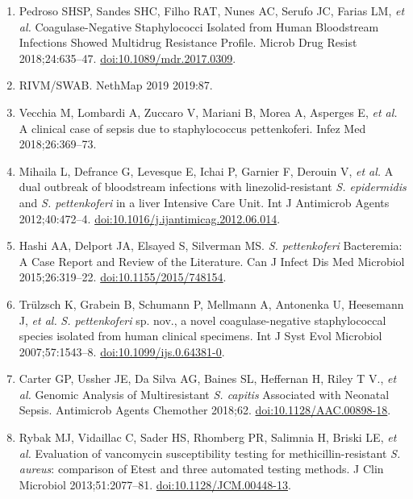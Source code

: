 \documentclass[
]{book}
\begin{document}
\begin{enumerate}
\item
  Pedroso SHSP, Sandes SHC, Filho RAT, Nunes AC, Serufo JC, Farias LM, \emph{et al.} Coagulase-Negative Staphylococci Isolated from Human Bloodstream Infections Showed Multidrug Resistance Profile. Microb Drug Resist 2018;24:635--47. \url{doi:10.1089/mdr.2017.0309}.
\item
  RIVM/SWAB. NethMap 2019 2019:87.
\item
  Vecchia M, Lombardi A, Zuccaro V, Mariani B, Morea A, Asperges E, \emph{et al.} A clinical case of sepsis due to staphylococcus pettenkoferi. Infez Med 2018;26:369--73.
\item
  Mihaila L, Defrance G, Levesque E, Ichai P, Garnier F, Derouin V, \emph{et al.} A dual outbreak of bloodstream infections with linezolid-resistant \emph{S. epidermidis} and \emph{S. pettenkoferi} in a liver Intensive Care Unit. Int J Antimicrob Agents 2012;40:472--4. \url{doi:10.1016/j.ijantimicag.2012.06.014}.
\item
  Hashi AA, Delport JA, Elsayed S, Silverman MS. \emph{S. pettenkoferi} Bacteremia: A Case Report and Review of the Literature. Can J Infect Dis Med Microbiol 2015;26:319--22. \url{doi:10.1155/2015/748154}.
\item
  Trülzsch K, Grabein B, Schumann P, Mellmann A, Antonenka U, Heesemann J, \emph{et al.} \emph{S. pettenkoferi} sp. nov., a novel coagulase-negative staphylococcal species isolated from human clinical specimens. Int J Syst Evol Microbiol 2007;57:1543--8. \url{doi:10.1099/ijs.0.64381-0}.
\item
  Carter GP, Ussher JE, Da Silva AG, Baines SL, Heffernan H, Riley T V., \emph{et al.} Genomic Analysis of Multiresistant \emph{S. capitis} Associated with Neonatal Sepsis. Antimicrob Agents Chemother 2018;62. \url{doi:10.1128/AAC.00898-18}.
\item
  Rybak MJ, Vidaillac C, Sader HS, Rhomberg PR, Salimnia H, Briski LE, \emph{et al.} Evaluation of vancomycin susceptibility testing for methicillin-resistant \emph{S. aureus}: comparison of Etest and three automated testing methods. J Clin Microbiol 2013;51:2077--81. \url{doi:10.1128/JCM.00448-13}.
\end{enumerate}

  
\end{document}
